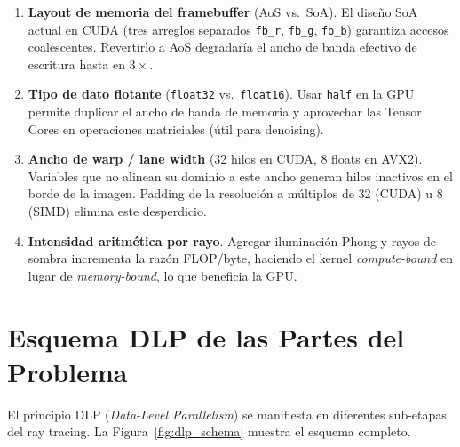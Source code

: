 \documentclass[conference]{IEEEtran}
\begin{document}
\begin{enumerate}

  \item \textbf{Layout de memoria del framebuffer} (AoS vs.\ SoA).
    El diseño SoA actual en CUDA (tres arreglos separados \texttt{fb\_r}, \texttt{fb\_g},
    \texttt{fb\_b}) garantiza accesos coalescentes. Revertirlo a AoS degradaría el
    ancho de banda efectivo de escritura hasta en $3\!\times$.

  \item \textbf{Tipo de dato flotante} (\texttt{float32} vs.\ \texttt{float16}).
    Usar \texttt{half} en la GPU permite duplicar el ancho de banda de memoria y
    aprovechar las Tensor Cores en operaciones matriciales (útil para denoising).

  \item \textbf{Ancho de warp / lane width} (32 hilos en CUDA, 8 floats en AVX2).
    Variables que no alinean su dominio a este ancho generan hilos inactivos en el
    borde de la imagen. Padding de la resolución a múltiplos de 32 (CUDA) u 8 (SIMD)
    elimina este desperdicio.

  \item \textbf{Intensidad aritmética por rayo}.
    Agregar iluminación Phong y rayos de sombra incrementa la razón
    FLOP/byte, haciendo el kernel \textit{compute-bound} en lugar de
    \textit{memory-bound}, lo que beneficia la GPU.

\end{enumerate}

\section{Esquema DLP de las Partes del Problema}

El principio DLP (\textit{Data-Level Parallelism}) se manifiesta en diferentes
sub-etapas del ray tracing. La Figura~\ref{fig:dlp_schema} muestra el esquema completo.
\end{document}
